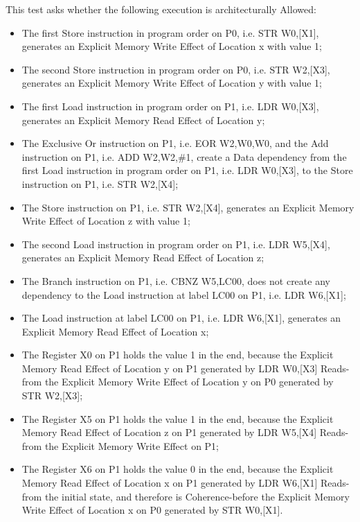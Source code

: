 This test asks whether the following execution is architecturally Allowed:

\begin{itemize}
  \item The first Store instruction in program order on P0, i.e. STR W0,[X1], generates an Explicit Memory Write Effect of Location x with value 1;
  \item The second Store instruction in program order on P0, i.e. STR W2,[X3], generates an Explicit Memory Write Effect of Location y with value 1;
  \item The first Load instruction in program order on P1, i.e. LDR W0,[X3], generates an Explicit Memory Read Effect of Location y;
  \item The Exclusive Or instruction on P1, i.e. EOR W2,W0,W0, and the Add instruction on P1, i.e. ADD W2,W2,\#1, create a Data dependency from the first Load instruction in program order on P1, i.e. LDR W0,[X3], to the Store instruction on P1, i.e. STR W2,[X4];
  \item The Store instruction on P1, i.e. STR W2,[X4], generates an Explicit Memory Write Effect of Location z with value 1;
  \item The second Load instruction in program order on P1, i.e. LDR W5,[X4], generates an Explicit Memory Read Effect of Location z;
  \item The Branch instruction on P1, i.e. CBNZ W5,LC00, does not create any dependency to the Load instruction at label LC00 on P1, i.e. LDR W6,[X1];
  \item The Load instruction at label LC00 on P1, i.e. LDR W6,[X1], generates an Explicit Memory Read Effect of Location x;
  \item The Register X0 on P1 holds the value 1 in the end, because the Explicit Memory Read Effect of Location y on P1 generated by LDR W0,[X3] Reads-from the Explicit Memory Write Effect of Location y on P0 generated by STR W2,[X3];
  \item The Register X5 on P1 holds the value 1 in the end, because the Explicit Memory Read Effect of Location z on P1 generated by LDR W5,[X4] Reads-from the Explicit Memory Write Effect on P1;
  \item The Register X6 on P1 holds the value 0 in the end, because the Explicit Memory Read Effect of Location x on P1 generated by LDR W6,[X1] Reads-from the initial state, and therefore is Coherence-before the Explicit Memory Write Effect of Location x on P0 generated by STR W0,[X1].
\end{itemize}
